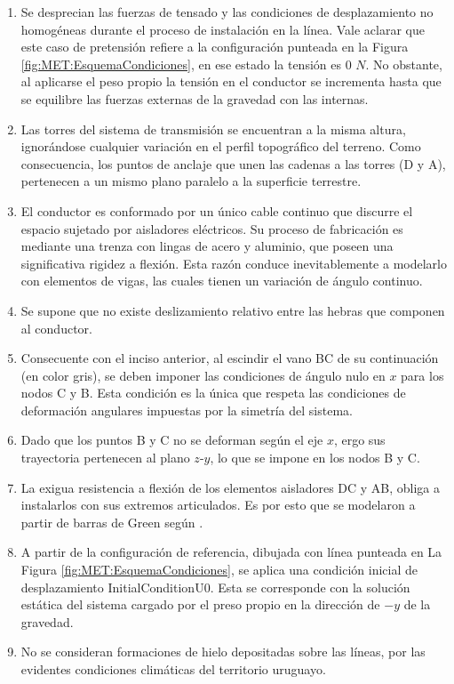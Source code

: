 \begin{enumerate}
	\item  Se desprecian las fuerzas de tensado y las condiciones de desplazamiento no homogéneas durante el proceso de instalación en la línea. Vale aclarar que este caso de pretensión refiere a la configuración punteada en la Figura \ref{fig:MET:EsquemaCondiciones}, en ese estado la tensión es 0 $N$. No obstante, al aplicarse el peso propio la tensión en el conductor se incrementa hasta que se equilibre las fuerzas externas de la gravedad con las internas. 
	\item Las torres del sistema de transmisión se encuentran a la misma altura, ignorándose cualquier variación en el perfil topográfico del terreno. Como consecuencia, los puntos de anclaje que unen las cadenas a las torres (D y A), pertenecen a un mismo plano paralelo a la superficie terrestre.
	\item  El conductor es conformado por un único cable continuo que discurre el espacio sujetado por aisladores eléctricos. Su proceso de fabricación es mediante una trenza con lingas de acero y aluminio, que poseen una significativa rigidez a flexión. Esta razón conduce inevitablemente a modelarlo con elementos de vigas, las cuales tienen un variación de ángulo continuo.
	\item Se supone que no existe deslizamiento relativo entre las hebras que componen al conductor.  
	\item Consecuente con el inciso anterior, al escindir el vano BC de su continuación (en color gris), se deben imponer las condiciones de ángulo nulo en $x$ para los nodos C y B. Esta condición es la única que respeta las condiciones de deformación angulares impuestas por la simetría del sistema.
	\item Dado que los puntos B y C no se deforman según el eje $x$, ergo sus trayectoria pertenecen al plano $z$-$y$, lo que se impone en los nodos B y C. 
	\item La exigua resistencia a flexión de los elementos aisladores DC y AB, obliga a instalarlos con sus extremos articulados. Es por esto que se modelaron a partir de barras de Green según \citep{Crisfield}. 
	\item A partir de la configuración de referencia, dibujada con línea punteada en La Figura \ref{fig:MET:EsquemaCondiciones}, se aplica una condición inicial de desplazamiento \gls{InitialConditionU0}. Esta se corresponde con la solución estática del sistema cargado por el preso propio en la dirección de $-y$ de la gravedad.
	\item No se consideran formaciones de hielo depositadas sobre las líneas, por las evidentes condiciones climáticas del territorio uruguayo.
\end{enumerate} 

